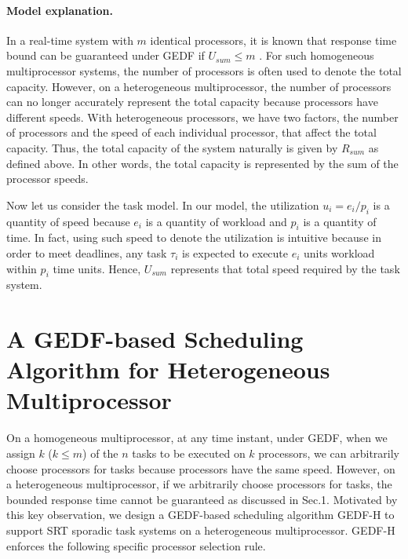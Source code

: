 \documentclass[Times, 10pt,twocolumn]{article}
\theoremstyle{definition}
\begin{document}
\paragraph{Model explanation.}
\label{sec:explanation}

In a real-time system with $m$ identical processors, it is known that response time bound can be guaranteed under GEDF if $U_{sum} \leq m$ \cite{Devi}.
For such homogeneous multiprocessor systems, the number of processors is often used to denote the total capacity. However, on a heterogeneous multiprocessor, the number of processors can no longer accurately represent the total capacity because processors have different speeds. With heterogeneous processors, we have two factors, the number of processors and the speed of each individual processor, that affect the total capacity. Thus, the total capacity of the system naturally is given by $R_{sum}$ as defined above. In other words, the total capacity is represented by the sum of the processor speeds.

Now let us consider the task model. In our model, the utilization $u_i=e_{i}/p_i$ is a quantity of speed because $e_i$ is a quantity of workload and $p_i$ is a quantity of time. In fact, using such speed to denote the utilization is intuitive because in order to meet deadlines, any task $\tau_i$ is expected to execute $e_i$ units workload within $p_i$ time units. Hence, $U_{sum}$ represents that total speed required by the task system. 


\section{A GEDF-based Scheduling Algorithm for Heterogeneous Multiprocessor}
\label{sec:GEDF-H}
On a homogeneous multiprocessor, at any time instant, under GEDF,  when we assign $k$ ($k \leq m$) of the $n$ tasks to be executed on $k$ processors, we can arbitrarily choose processors for tasks because processors have the same speed. However, on a heterogeneous multiprocessor, if we arbitrarily choose processors for tasks, the bounded response time cannot be guaranteed as discussed in Sec.1. Motivated by this key observation, we design a GEDF-based scheduling algorithm  GEDF-H to support SRT sporadic task systems on a heterogeneous multiprocessor. GEDF-H enforces the following specific processor selection rule.
\end{document}
